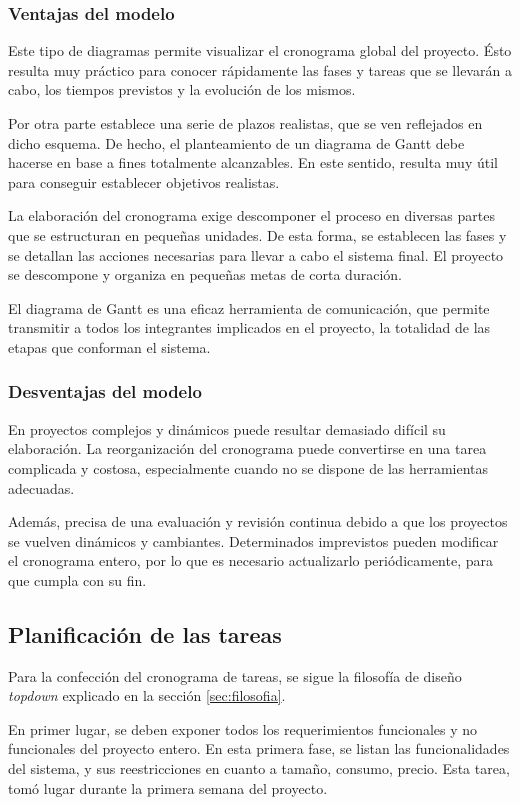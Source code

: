 \subsubsection{Ventajas del modelo}
Este tipo de diagramas permite visualizar el cronograma global del proyecto. 
Ésto resulta muy práctico para conocer rápidamente las fases y tareas que se llevarán a cabo, los tiempos previstos y la evolución de los mismos.

Por otra parte establece una serie de plazos realistas, que se ven reflejados en dicho esquema.
De hecho, el planteamiento de un diagrama de Gantt debe hacerse en base a fines totalmente alcanzables.
En este sentido, resulta muy útil para conseguir establecer objetivos realistas.

La elaboración del cronograma exige descomponer el proceso en diversas partes que se estructuran en pequeñas unidades. De esta forma, se establecen las fases y se detallan las acciones necesarias para llevar a cabo el sistema final. El proyecto se descompone y organiza en pequeñas metas de corta duración.

El diagrama de Gantt es una eficaz herramienta de comunicación, que permite transmitir a todos los integrantes implicados en el proyecto, la totalidad de las etapas que conforman el sistema.

\subsubsection{Desventajas del modelo}
En proyectos complejos y dinámicos puede resultar demasiado difícil su elaboración. La reorganización del cronograma puede convertirse en una tarea complicada y costosa, especialmente cuando no se dispone de las herramientas adecuadas.

Además, precisa de una evaluación y revisión continua debido a que los proyectos se vuelven dinámicos y cambiantes. Determinados imprevistos pueden modificar el cronograma entero, por lo que es necesario actualizarlo periódicamente, para que cumpla con su fin.

\subsection{Planificación de las tareas}

Para la confección del cronograma de tareas, se sigue la filosofía de diseño \emph{topdown} explicado en la sección \ref{sec:filosofia}.

En primer lugar, se deben exponer todos los requerimientos funcionales y no funcionales del proyecto entero.
En esta primera fase, se listan las funcionalidades del sistema, y sus reestricciones en cuanto a tamaño, consumo, precio.
Esta tarea, tomó lugar durante la primera semana del proyecto.

